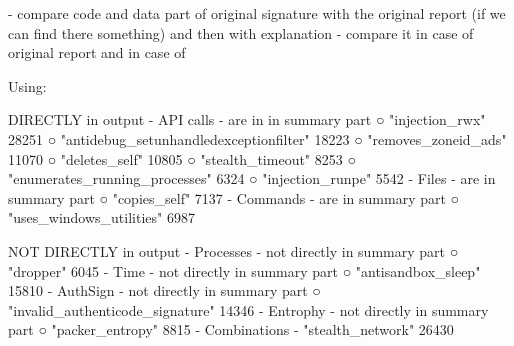   - compare code and data part of original signature with the original report (if we can find there something) and then with explanation
  - compare it in case of original report and in case of 



Using:

DIRECTLY in output
	- API calls - are in in summary part
		○ "injection_rwx" 28251
		○ "antidebug_setunhandledexceptionfilter" 18223
		○ "removes_zoneid_ads" 11070
		○ "deletes_self" 10805
		○ "stealth_timeout" 8253
		○ "enumerates_running_processes" 6324
		○ "injection_runpe"  5542
  - Files - are in summary part
		○ "copies_self" 7137
	- Commands - are in summary part
		○ "uses_windows_utilities" 6987

NOT DIRECTLY in output
	- Processes - not directly in summary part
		○ "dropper"  6045
	- Time - not directly in summary part
		○ "antisandbox_sleep" 15810
	- AuthSign - not directly in summary part
		○ "invalid_authenticode_signature" 14346
	- Entrophy - not directly in summary part
		○ "packer_entropy" 8815
	- Combinations - 
    "stealth_network" 26430
